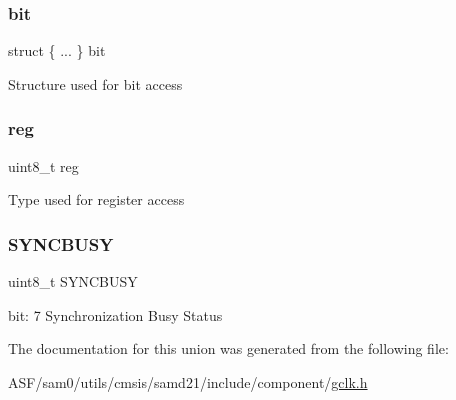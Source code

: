 \subsubsection{\texorpdfstring{bit}{bit}}
{\footnotesize\ttfamily struct \{ ... \}   bit}

Structure used for bit access \mbox{\label{union_g_c_l_k___s_t_a_t_u_s___type_a9428adc9af4653a2050e2536b55dec8d}} 
\subsubsection{\texorpdfstring{reg}{reg}}
{\footnotesize\ttfamily uint8\+\_\+t reg}

Type used for register access \mbox{\label{union_g_c_l_k___s_t_a_t_u_s___type_abb30254758e23bd24824e436a1aa8716}} 
\subsubsection{\texorpdfstring{SYNCBUSY}{SYNCBUSY}}
{\footnotesize\ttfamily uint8\+\_\+t S\+Y\+N\+C\+B\+U\+SY}

bit\+: 7 Synchronization Busy Status 

The documentation for this union was generated from the following file\+:\begin{DoxyCompactItemize}
\item 
A\+S\+F/sam0/utils/cmsis/samd21/include/component/\mbox{\hyperlink{utils_2cmsis_2samd21_2include_2component_2gclk_8h}{gclk.\+h}}\end{DoxyCompactItemize}

